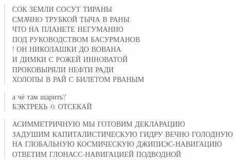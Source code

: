 \poemtitle{***}
\begin{verse}
СОК ЗЕМЛИ СОСУТ ТИРАНЫ\\
СМАЧНО ТРУБКОЙ ТЫЧА В РАНЫ\\
ЧТО НА ПЛАНЕТЕ НЕГУМАННО\\
ПОД РУКОВОДСТВОМ БАСУРМАНОВ\\!
ОН НИКОЛАШКИ ДО ВОВАНА\\
И ДИМКИ С РОЖЕЙ ИННОВАТОЙ\\
ПРОКОВЫРЯЛИ НЕФТИ РАДИ\\
ХОЛОПЫ В РАЙ С БИЛЕТОМ РВАНЫМ
\end{verse}

\poemtitle{***}
\begin{verse}
а чё там шарить?\\
БЭКТРЕКЬ @ ОТСЕКАЙ
\end{verse}

\poemtitle{***}
\begin{verse}
АСИММЕТРИЧНУЮ  МЫ ГОТОВИМ ДЕКЛАРАЦИЮ\\
ЗАДУШИМ КАПИТАЛИСТИЧЕСКУЮ ГИДРУ ВЕЧНО ГОЛОДНУЮ\\
НА ГЛОБАЛЬНУЮ КОСМИЧЕСКУЮ ДЖИПИЭС-НАВИГАЦИЮ\\
ОТВЕТИМ ГЛОНАСС-НАВИГАЦИЕЙ ПОДВОДНОЙ
\end{verse}

